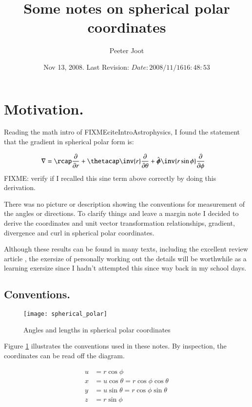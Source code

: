 \documentclass{article}
\title{Some notes on spherical polar coordinates}
\author{Peeter Joot}
\date{ Nov 13, 2008.  Last Revision: $Date: 2008/11/16 16:48:53 $ }
\newcommand{\phicap}[0]{\hat{\boldsymbol{\phi}}}
\begin{document}
\maketitle{}
\tableofcontents

\section{ Motivation. }

Reading the math intro of FIXMEcite{IntroAstrophysics}, I found the statement that the gradient in spherical polar form is:

\begin{align*}
\grad &= 
\rcap \PD{r}{}
+\thetacap \inv{r} \PD{\theta}{}
+\phicap \inv{r \sin\phi}\PD{\phi}{}
\end{align*}
FIXME: verify if I recalled this sine term above correctly by doing this derivation.

There was no picture or description showing the conventions for measurement of the angles or directions.
To clarify things and leave a margin note I decided to derive the coordinates and unit vector transformation relationships,
gradient, divergence and curl in spherical polar coordinates.

Although these results can be found in many texts, including the excellent review article \cite{fleischCoords}, 
the exersize of personally working out the details will be worthwhile as a learning exersize since I hadn't attempted this since
way back in my school days.

\subsection{ Conventions. }

\begin{figure}[htp]
\centering
\texttt{[image: spherical\_polar]}
\caption{Angles and lengths in spherical polar coordinates}\label{fig:spherical_polar}
\end{figure}

Figure \ref{fig:spherical_polar} illustrates the conventions used in 
these notes.  By inspection, the coordinates can be read off the diagram.

\begin{align}\label{eqn:coordinates}
u &= r \cos\phi \\
x &= u \cos\theta = r \cos\phi \cos\theta \\
y &= u \sin\theta = r \cos\phi \sin\theta \\
z &= r \sin\phi
\end{align}
\end{document}

